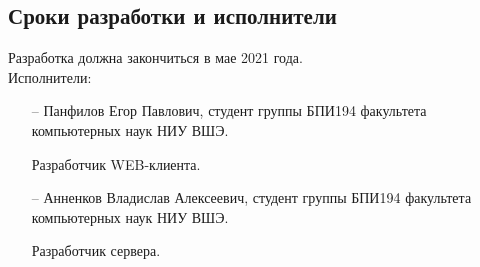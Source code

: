 \subsection{Сроки разработки и исполнители}
Разработка должна закончиться в мае 2021 года.\\

Исполнители:
\begin{itemize}
    \item[--] Панфилов Егор Павлович, студент группы БПИ194 факультета компьютерных наук НИУ ВШЭ.

    Разработчик WEB-клиента.
    \item[--] Анненков Владислав Алексеевич, студент группы БПИ194 факультета компьютерных наук НИУ ВШЭ.

    Разработчик сервера.
\end{itemize}